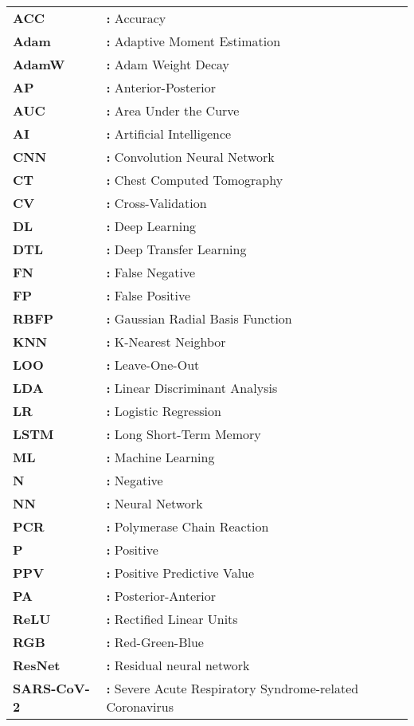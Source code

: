 \hspace{-3mm}
\begin{tabular}{p{2cm}l}
{\bf ACC}   & {\bf:} Accuracy\\
{\bf Adam}  & {\bf:} Adaptive Moment Estimation \\
{\bf AdamW} & {\bf:} Adam Weight Decay \\
{\bf AP}    & {\bf:} Anterior-Posterior  \\
{\bf AUC}   & {\bf:} Area Under the Curve\\
{\bf AI}    & {\bf:} Artificial Intelligence\\
{\bf CNN}   & {\bf:} Convolution Neural Network\\
{\bf CT}   & {\bf:}  Chest Computed Tomography\\
{\bf CV}    & {\bf:} Cross-Validation\\
{\bf DL}    & {\bf:} Deep Learning\\
{\bf DTL}   & {\bf:} Deep Transfer Learning\\
{\bf FN}    & {\bf:} False Negative\\
{\bf FP}    & {\bf:} False Positive\\
{\bf RBFP}  & {\bf:} Gaussian Radial Basis Function\\
{\bf KNN}   & {\bf:} K-Nearest Neighbor\\
{\bf LOO}   & {\bf:} Leave-One-Out\\
{\bf LDA}   & {\bf:} Linear Discriminant Analysis\\
{\bf LR}    & {\bf:} Logistic Regression\\
{\bf LSTM}  & {\bf:} Long Short-Term Memory\\
{\bf ML}    & {\bf:} Machine Learning\\
{\bf N}     & {\bf:} Negative\\
{\bf NN}    & {\bf:} Neural Network\\
{\bf PCR}   & {\bf:} Polymerase Chain Reaction\\
{\bf P}     & {\bf:} Positive\\
{\bf PPV}   & {\bf:} Positive Predictive Value\\
{\bf PA}    & {\bf:} Posterior-Anterior \\
{\bf ReLU}  & {\bf:} Rectified Linear Units \\
{\bf RGB}  & {\bf:} Red-Green-Blue \\
{\bf ResNet} & {\bf:}  Residual neural network \\
{\bf SARS-CoV-2} & {\bf:} Severe Acute Respiratory Syndrome-related Coronavirus \\

\end{tabular}

